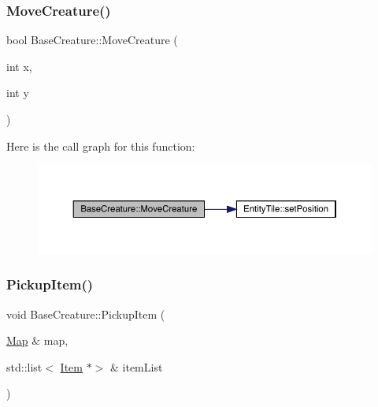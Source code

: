 \subsubsection{\texorpdfstring{Move\+Creature()}{MoveCreature()}}
{\footnotesize\ttfamily bool Base\+Creature\+::\+Move\+Creature (\begin{DoxyParamCaption}\item[{int}]{x,  }\item[{int}]{y }\end{DoxyParamCaption})}

Here is the call graph for this function\+:
\nopagebreak
\begin{figure}[H]
\begin{center}
\leavevmode
\includegraphics[width=350pt]{d2/d3b/class_base_creature_a77f0a7d7c441406c252c3278817454d8_cgraph}
\end{center}
\end{figure}
\mbox{\label{class_base_creature_a2d45724079ff2eeb6606b222e405e4a8}} 
\subsubsection{\texorpdfstring{Pickup\+Item()}{PickupItem()}}
{\footnotesize\ttfamily void Base\+Creature\+::\+Pickup\+Item (\begin{DoxyParamCaption}\item[{\mbox{\hyperlink{class_map}{Map}} \&}]{map,  }\item[{std\+::list$<$ \mbox{\hyperlink{class_item}{Item}} $\ast$$>$ \&}]{item\+List }\end{DoxyParamCaption})}

